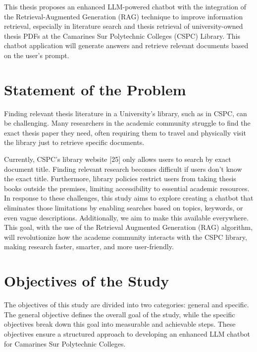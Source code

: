 \begin{refsection}
\bigbreak
\hspace{0.4cm}This thesis proposes an enhanced LLM-powered chatbot with the integration of the Retrieval-Augmented Generation (RAG) technique to improve information retrieval, especially in literature search and thesis retrieval of university-owned thesis PDFs at the Camarines Sur Polytechnic Colleges (CSPC) Library. This chatbot application will generate answers and retrieve relevant documents based on the user's prompt.


\section{Statement of the Problem}

\hspace{1cm}Finding relevant thesis literature in a University's library, such as in CSPC, can be challenging. Many researchers in the academic community struggle to find the exact thesis paper they need, often requiring them to travel and physically visit the library just to retrieve specific documents.

\bigbreak
\hspace{0.4cm}Currently, CSPC’s library website [25] only allows users to search by exact document title. Finding relevant research becomes difficult if users don’t know the exact title. Furthermore, library policies restrict users from taking thesis books outside the premises, limiting accessibility to essential academic resources.  In response to these challenges, this study aims to explore creating a chatbot that eliminates those limitations by enabling searches based on topics, keywords, or even vague descriptions. Additionally, we aim to make this available everywhere. 
\newpage
\clearpage
This goal, with the use of the Retrieval Augmented Generation (RAG) algorithm, will revolutionize how the academe community interacts with the CSPC library, making research faster, smarter, and more user-friendly. 


\section{Objectives of the Study}
\hspace{0.4cm}The objectives of this study are divided into two categories: general and specific. The general objective defines the overall goal of the study, while the specific objectives break down this goal into measurable and achievable steps. These objectives ensure a structured approach to developing an enhanced LLM chatbot for Camarines Sur Polytechnic Colleges. 


\end{refsection}
